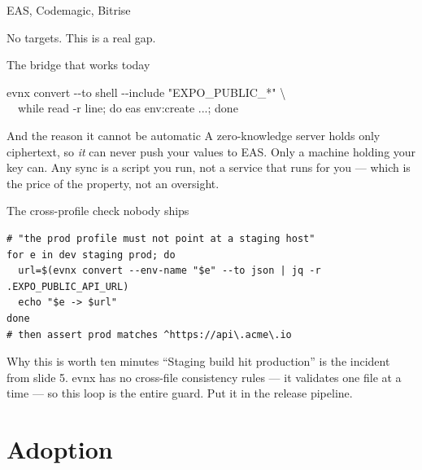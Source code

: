 \documentclass[aspectratio=169,10pt]{beamer}
\begin{document}
\begin{frame}{EAS, Codemagic, Bitrise}
  \begin{center}\large No targets. This is a real gap.\end{center}

  \vspace{1em}
  \begin{block}{The bridge that works today}
\begin{center}\ttfamily\small
evnx convert -{}-to shell -{}-include "EXPO\_PUBLIC\_*" \textbar{} \textbackslash \\
\ \ while read -r line; do eas env:create ...; done
\end{center}
  \end{block}

  \vspace{0.8em}
  \begin{block}{And the reason it cannot be automatic}
    A zero-knowledge server holds only ciphertext, so \emph{it} can never push
    your values to EAS. Only a machine holding your key can. Any sync is a
    script you run, not a service that runs for you --- which is the price of
    the property, not an oversight.
  \end{block}
\end{frame}

\begin{frame}[fragile]{The cross-profile check nobody ships}
\begin{lstlisting}[style=evnxcode]
# "the prod profile must not point at a staging host"
for e in dev staging prod; do
  url=$(evnx convert --env-name "$e" --to json | jq -r .EXPO_PUBLIC_API_URL)
  echo "$e -> $url"
done
# then assert prod matches ^https://api\.acme\.io
\end{lstlisting}

  \vspace{0.6em}
  \begin{block}{Why this is worth ten minutes}
    ``Staging build hit production'' is the incident from slide 5. evnx has no
    cross-file consistency rules --- it validates one file at a time --- so
    this loop is the entire guard. Put it in the release pipeline.
  \end{block}
\end{frame}

\section{Adoption}
\end{document}
